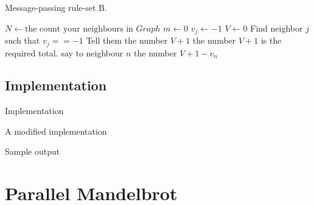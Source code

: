 \documentclass[pdflatex,colorlinks,landscape]{beamer}
\begin{document}
\begin{frame}[allowframebreaks]{Message-passing rule-set B.}
  \begin{algorithmic}[1]
      \State $N \gets \text{the count your neighbours in $Graph$}$
      \State $m\gets 0$ 
        \State $v_j\gets -1$ 
      \EndFor
      \State $V\gets 0$ 
        \State Find neighbor $j$ such that $v_j==-1$
        \State Tell them the number $V + 1$
      \EndIf
      \newpage
        \State the number $V + 1$ is the required total.
          \State say to neighbour $n$ the number $V + 1 - v_n$
        \EndFor
      \EndIf
    \EndProcedure
  \end{algorithmic}
\end{frame}

\subsection{Implementation}

\begin{frame}[allowframebreaks]{Implementation}
  \begin{tiny}
    
  \end{tiny}
\end{frame}

\begin{frame}[allowframebreaks]{A modified implementation}
  \begin{tiny}
    
  \end{tiny}
\end{frame}

\begin{frame}[allowframebreaks]{Sample output}
  \begin{tiny}
  \end{tiny}
\end{frame}

\section{Parallel Mandelbrot}
\end{document}
